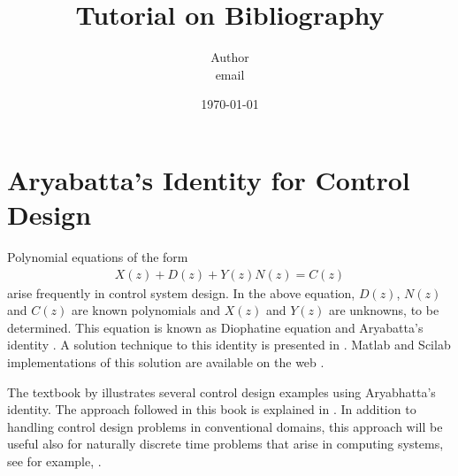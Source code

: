 \documentclass[12pt]{article}
\title{Tutorial on Bibliography}
\author{Author\\email\\ \byncsa}
\date{\today}
\begin{document}
\maketitle
\newpage
\section{Aryabatta's Identity for Control Design}

Polynomial equations of the form
\begin{align*}
X(z)+D(z) + Y(z)N(z) = C(z)
\end{align*}
arise frequently in control system design. In the above equation, $D(z)$, $N(z)$ and $C(z)$ are known polynomials and $X(z)$ and $Y(z)$ are unknowns, to be determined. This equation is known as Diophatine equation \cite{vk79,tk80} and Aryabatta's identity \cite{mv85}. A solution technique to this identity is presented in
\cite{cp82}.  Matlab and Scilab implementations of this solution are
available on the web \cite{kmm1-07}.

The textbook by  
illustrates several control design
examples using Aryabhatta's identity.  The approach followed in this
book is explained in \cite{ms04,km06}.  In addition to handling
control design problems in conventional domains, this approach will 
be useful also for naturally discrete time problems that arise in
computing systems, see for example, \cite{mmr03,mrbm04,vs06}.

\end{document}

